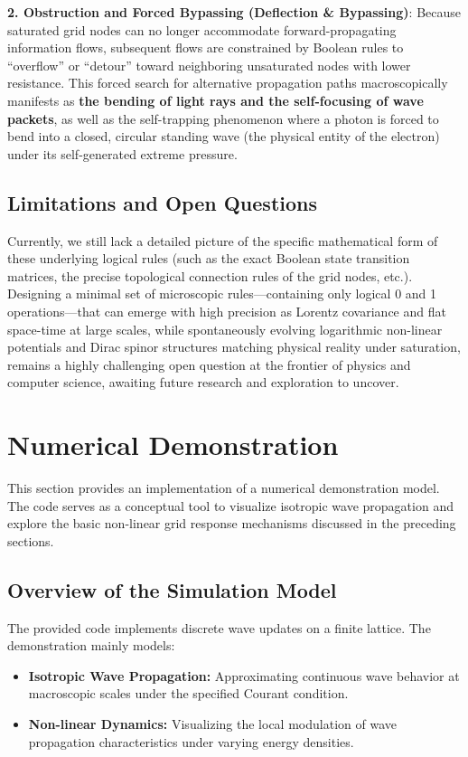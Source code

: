 \documentclass[12pt, a4paper]{article}
\begin{document}
\textbf{2. Obstruction and Forced Bypassing (Deflection \& Bypassing)}: Because saturated grid nodes can no longer accommodate forward-propagating information flows, subsequent flows are constrained by Boolean rules to ``overflow'' or ``detour'' toward neighboring unsaturated nodes with lower resistance. This forced search for alternative propagation paths macroscopically manifests as \textbf{the bending of light rays and the self-focusing of wave packets}, as well as the self-trapping phenomenon where a photon is forced to bend into a closed, circular standing wave (the physical entity of the electron) under its self-generated extreme pressure.

\subsection{Limitations and Open Questions}

Currently, we still lack a detailed picture of the specific mathematical form of these underlying logical rules (such as the exact Boolean state transition matrices, the precise topological connection rules of the grid nodes, etc.). Designing a minimal set of microscopic rules—containing only logical 0 and 1 operations—that can emerge with high precision as Lorentz covariance and flat space-time at large scales, while spontaneously evolving logarithmic non-linear potentials and Dirac spinor structures matching physical reality under saturation, remains a highly challenging open question at the frontier of physics and computer science, awaiting future research and exploration to uncover.







\section{Numerical Demonstration}

This section provides an implementation of a numerical demonstration model. The code serves as a conceptual tool to visualize isotropic wave propagation and explore the basic non-linear grid response mechanisms discussed in the preceding sections.

\subsection{Overview of the Simulation Model}

The provided code implements discrete wave updates on a finite lattice. The demonstration mainly models:
\begin{itemize}
    \item \textbf{Isotropic Wave Propagation:} Approximating continuous wave behavior at macroscopic scales under the specified Courant condition.
    \item \textbf{Non-linear Dynamics:} Visualizing the local modulation of wave propagation characteristics under varying energy densities.
\end{itemize}
\end{document}
